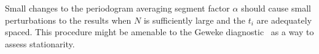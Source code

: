\documentclass[letterpaper,11pt,nointlimits,reqno]{amsart}
\begin{document}
Small changes to the periodogram averaging segment factor $\alpha$ should cause
small perturbations to the results when $N$ is sufficiently large and the $t_i$
are adequately spaced.  This procedure might be amenable to the Geweke
diagnostic~\citep{Geweke1992Evaluating} as a way to assess stationarity.

\newcommand*{\doi}[1]{\href{http://dx.doi.org/\detokenize{#1}}{doi: #1}}


\end{document}
